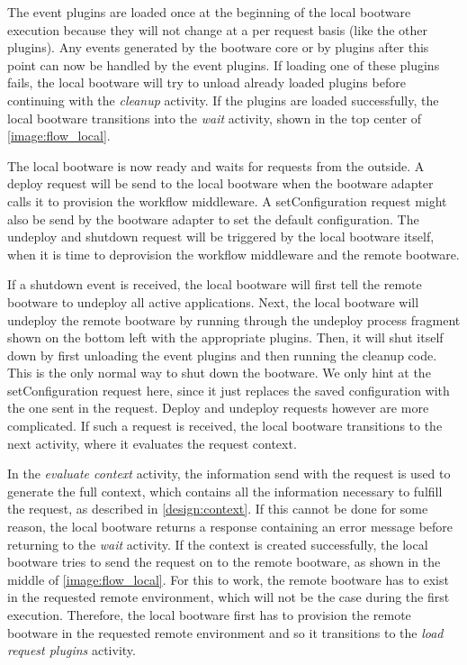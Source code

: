 The event plugins are loaded once at the beginning of the local bootware execution because they will not change at a per request basis (like the other plugins).
Any events generated by the bootware core or by plugins after this point can now be handled by the event plugins.
If loading one of these plugins fails, the local bootware will try to unload already loaded plugins before continuing with the \textit{cleanup} activity.
If the plugins are loaded successfully, the local bootware transitions into the \textit{wait} activity, shown in the top center of \autoref{image:flow_local}.

The local bootware is now ready and waits for requests from the outside.
A deploy request will be send to the local bootware when the bootware adapter calls it to provision the workflow middleware.
A setConfiguration request might also be send by the bootware adapter to set the default configuration.
The undeploy and shutdown request will be triggered by the local bootware itself, when it is time to deprovision the workflow middleware and the remote bootware.

If a shutdown event is received, the local bootware will first tell the remote bootware to undeploy all active applications.
Next, the local bootware will undeploy the remote bootware by running through the undeploy process fragment shown on the bottom left with the appropriate plugins.
Then, it will shut itself down by first unloading the event plugins and then running the cleanup code.
This is the only normal way to shut down the bootware.
We only hint at the setConfiguration request here, since it just replaces the saved configuration with the one sent in the request.
Deploy and undeploy requests however are more complicated.
If such a request is received, the local bootware transitions to the next activity, where it evaluates the request context.

In the \textit{evaluate context} activity, the information send with the request is used to generate the full context, which contains all the information necessary to fulfill the request, as described in \autoref{design:context}.
If this cannot be done for some reason, the local bootware returns a response containing an error message before returning to the \textit{wait} activity.
If the context is created successfully, the local bootware tries to send the request on to the remote bootware, as shown in the middle of \autoref{image:flow_local}.
For this to work, the remote bootware has to exist in the requested remote environment, which will not be the case during the first execution.
Therefore, the local bootware first has to provision the remote bootware in the requested remote environment and so it transitions to the \textit{load request plugins} activity.

